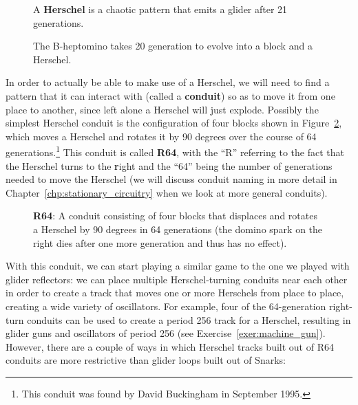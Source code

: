 \begin{figure}[!htb]
	\centering
	\begin{minipage}{.43\textwidth}
		\centering{}
		\caption{A \textbf{Herschel} is a chaotic pattern that emits a glider after 21 generations.}\label{fig:herschel}
	\end{minipage} \hfill %
	\begin{minipage}{.53\textwidth}
		\centering{}
		\caption{The B-heptomino takes 20 generation to evolve into a block and a Herschel.}\label{fig:b_heptomino_to_herschel}
	\end{minipage}
\end{figure}

In order to actually be able to make use of a Herschel, we will need to find a pattern that it can interact with (called a \textbf{conduit}) so as to move it from one place to another, since left alone a Herschel will just explode. Possibly the simplest Herschel conduit is the configuration of four blocks shown in Figure~\ref{fig:herschel_64}, which moves a Herschel and rotates it by 90 degrees over the course of 64 generations.\footnote{This conduit was found by David Buckingham in September 1995.} This conduit is called \textbf{R64}, with the ``R'' referring to the fact that the Herschel turns to the \textbf{r}ight and the ``64'' being the number of generations needed to move the Herschel (we will discuss conduit naming in more detail in Chapter~\ref{chp:stationary_circuitry} when we look at more general conduits). 

\begin{figure}[!htb]
	\centering{}
	\caption{\textbf{R64}: A conduit consisting of four blocks that displaces and rotates a Herschel by 90 degrees in 64 generations (the domino spark on the right dies after one more generation and thus has no effect).}\label{fig:herschel_64}
\end{figure}

With this conduit, we can start playing a similar game to the one we played with glider reflectors: we can place multiple Herschel-turning conduits near each other in order to create a track that moves one or more Herschels from place to place, creating a wide variety of oscillators. For example, four of the 64-generation right-turn conduits can be used to create a period 256 track for a Herschel, resulting in glider guns and oscillators of period 256 (see Exercise~\ref{exer:machine_gun}). However, there are a couple of ways in which Herschel tracks built out of R64 conduits are more restrictive than glider loops built out of Snarks:\medskip

